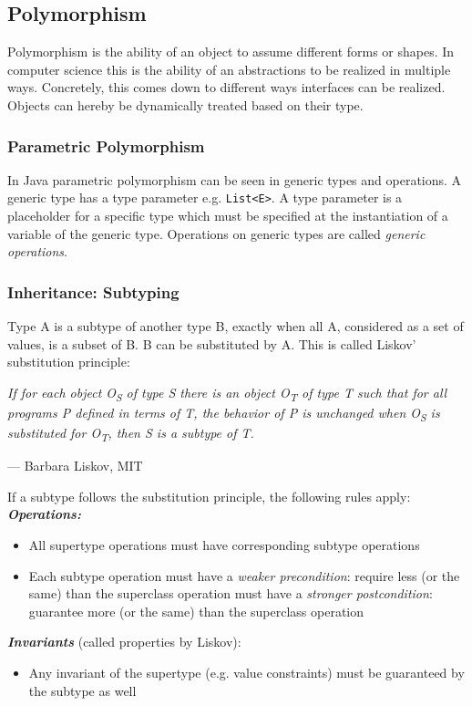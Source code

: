\subsection{Polymorphism}
Polymorphism is the ability of an object to assume different forms or shapes.
In computer science this is the ability of an abstractions to be realized in multiple ways.
Concretely, this comes down to different ways interfaces can be realized.
Objects can hereby be dynamically treated based on their type.

\subsubsection*{Parametric Polymorphism}
In Java parametric polymorphism can be seen in generic types and operations.
A generic type has a type parameter e.g. \texttt{List<E>}.
A type parameter is a placeholder for a specific type which must be specified at the instantiation of a variable of the generic type.
Operations on generic types are called \textit{generic operations}.

\subsubsection*{Inheritance: Subtyping}
Type A is a subtype of another type B, exactly when all A, considered as a set of values, is a subset of B. B can be substituted by A. This is called Liskov' substitution principle:\newline

\textit{If for each object O\textsubscript{S} of type S there is an object O\textsubscript{T} of type T	such that for all programs P	defined in terms of T, the behavior	of P is unchanged when O\textsubscript{S} is	substituted for O\textsubscript{T}, then S is a subtype of T.}\newline
\begin{flushright}
	--- Barbara Liskov, MIT
\end{flushright}

If a subtype follows the substitution principle, the following rules apply:\newline
\textbf{\textit{Operations:}}
\begin{itemize}[topsep=5pt, itemsep=0pt]
	\item All supertype operations must have corresponding subtype
	operations
	\item Each subtype operation
	\subitem must have a \textit{weaker precondition}: require less (or the	same) than the superclass operation
	\subitem must have a \textit{stronger postcondition}: guarantee more (or the same) than the superclass operation
\end{itemize}
\textbf{\textit{Invariants}} (called properties by Liskov):
\begin{itemize}[topsep=5pt, itemsep=0pt]
	\item Any invariant of the supertype (e.g. value constraints) must be guaranteed by the subtype as well
\end{itemize}

